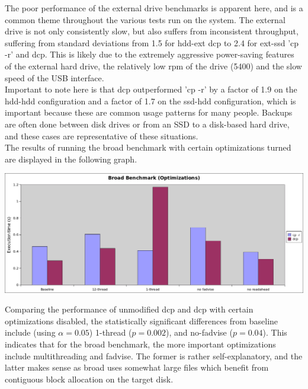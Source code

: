 \documentclass[12pt]{article}
\begin{document}
The poor performance of the external
drive benchmarks is apparent here, and is a common theme throughout
the various tests run on the system. The external drive is not only
consistently slow, but also suffers from inconsistent throughput,
suffering from standard deviations from 1.5 for hdd-ext dcp
to 2.4 for ext-ssd 'cp -r' and dcp. This is likely due to the
extremely aggressive power-saving features of the external hard drive,
the relatively low rpm of the drive (5400) and the slow speed of the
USB interface. \\

Important to note here is that dcp outperformed 'cp -r' by a factor
of 1.9 on the hdd-hdd configuration and a factor of 1.7 on the
ssd-hdd configuration, which is important because these are common
usage patterns for many people. Backups are often done between disk drives
or from an SSD to a disk-based hard drive, and these cases are representative
of these situations. \\

The results of running the broad benchmark with certain optimizations turned
are displayed in the following graph.\\

\vspace{5mm}

\includegraphics[width=500pt]{report/graphs/broad-optimizations.png}

\vspace{5mm}

Comparing the performance of unmodified dcp and dcp with certain
optimizations disabled, the statistically significant differences
from baseline include (using $\alpha = 0.05$) 1-thread ($p = 0.002$),
and no-fadvise ($p = 0.04$). This indicates that for the broad benchmark,
the more important optimizations include multithreading and fadvise. The
former is rather self-explanatory, and the latter makes sense as
broad uses somewhat large files which benefit from contiguous
block allocation on the target disk. \\
\end{document}
